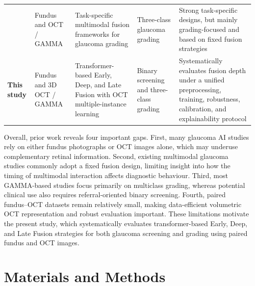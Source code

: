 \documentclass[preprint,12pt]{elsarticle}
\begin{document}
\begin{table}[!t]
{\begin{tabular}{p{} p{} p{} p{} p{}}
            \cite{cai2022corolla,zhao2025enhancing}                                                     &
            Fundus and OCT / GAMMA                                                                      &
            Task-specific multimodal fusion frameworks for glaucoma grading                             &
            Three-class glaucoma grading                                                                &
            Strong task-specific designs, but mainly grading-focused and based on fixed fusion strategies                                       \\

            \textbf{This study}                                                                         &
            Fundus and 3D OCT / GAMMA                                                                   &
            Transformer-based Early, Deep, and Late Fusion with OCT multiple-instance learning          &
            Binary screening and three-class grading                                                    &
            Systematically evaluates fusion depth under a unified preprocessing, training, robustness, calibration, and explainability protocol \\
            \hline
        \end{tabular}
    }
\end{table}

Overall, prior work reveals four important gaps. First, many glaucoma AI studies rely on either fundus photographs or OCT images alone, which may underuse complementary retinal information. Second, existing multimodal glaucoma studies commonly adopt a fixed fusion design, limiting insight into how the timing of multimodal interaction affects diagnostic behaviour. Third, most GAMMA-based studies focus primarily on multiclass grading, whereas potential clinical use also requires referral-oriented binary screening. Fourth, paired fundus--OCT datasets remain relatively small, making data-efficient volumetric OCT representation and robust evaluation important. These limitations motivate the present study, which systematically evaluates transformer-based Early, Deep, and Late Fusion strategies for both glaucoma screening and grading using paired fundus and OCT images.

\section{Materials and Methods}
\label{sec:materials_methods}
\end{document}
